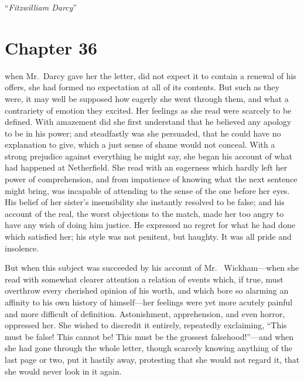 \medskip
``\emph{Fitzwilliam Darcy}''



\chapter{Chapter 36}


 when Mr.\ Darcy gave her the letter, did not expect
it to contain a renewal of his offers, she had formed no
expectation at all of its contents.  But such as they were, it
may well be supposed how eagerly she went through them, and what
a contrariety of emotion they excited.  Her feelings as she
read were scarcely to be defined.  With amazement did she first
understand that he believed any apology to be in his power; and
steadfastly was she persuaded, that he could have no explanation
to give, which a just sense of shame would not conceal.  With a
strong prejudice against everything he might say, she began his
account of what had happened at Netherfield.  She read with an
eagerness which hardly left her power of comprehension, and
from impatience of knowing what the next sentence might bring,
was incapable of attending to the sense of the one before her
eyes.  His belief of her sister's insensibility she instantly
resolved to be false; and his account of the real, the worst
objections to the match, made her too angry to have any wish of
doing him justice.  He expressed no regret for what he had done
which satisfied her; his style was not penitent, but haughty.
It was all pride and insolence.

But when this subject was succeeded by his account of Mr.\ %
Wickham---when she read with somewhat clearer attention a
relation of events which, if true, must overthrow every cherished
opinion of his worth, and which bore so alarming an affinity to
his own history of himself---her feelings were yet more acutely
painful and more difficult of definition.  Astonishment,
apprehension, and even horror, oppressed her.  She wished to
discredit it entirely, repeatedly exclaiming, ``This must be false!
This cannot be!  This must be the grossest falsehood!''---and
when she had gone through the whole letter, though scarcely
knowing anything of the last page or two, put it hastily away,
protesting that she would not regard it, that she would never
look in it again.

